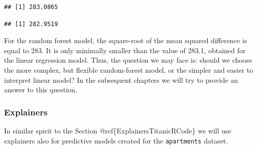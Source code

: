 \documentclass[12pt,]{krantz}
\newenvironment{Shaded}{\begin{snugshade}}{\end{snugshade}}
\newcommand{\DataTypeTok}[1]{\textcolor[rgb]{0.13,0.29,0.53}{#1}}
\newcommand{\DecValTok}[1]{\textcolor[rgb]{0.00,0.00,0.81}{#1}}
\newcommand{\KeywordTok}[1]{\textcolor[rgb]{0.13,0.29,0.53}{\textbf{#1}}}
\newcommand{\NormalTok}[1]{#1}
\newcommand{\OperatorTok}[1]{\textcolor[rgb]{0.81,0.36,0.00}{\textbf{#1}}}
\newcommand{\StringTok}[1]{\textcolor[rgb]{0.31,0.60,0.02}{#1}}
\begin{document}
\begin{verbatim}
## [1] 283.0865
\end{verbatim}

\begin{Shaded}
\end{Shaded}

\begin{verbatim}
## [1] 282.9519
\end{verbatim}

For the random forest model, the square-root of the mean squared difference is equal to 283. It is only minimally smaller than the value of 283.1, obtained for the linear regression model. Thus, the question we may face is: should we choose the more complex, but flexible random-forest model, or the simpler and easier to interpret linear model? In the subsequent chapters we will try to provide an answer to this question.

\hypertarget{ExplainersApartmentsRCode}{%
\subsubsection{Explainers}\label{ExplainersApartmentsRCode}}

In similar spirit to the Section @ref\{ExplainersTitanicRCode\} we will use explainers also for predictive models created for the \texttt{apartments} dataset.

\begin{Shaded}
\end{Shaded}
\end{document}
